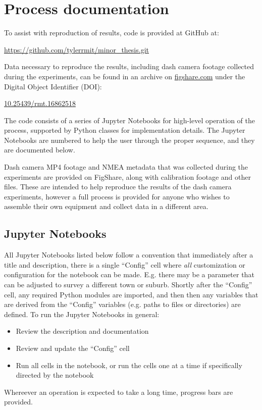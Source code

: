 \documentclass[11pt,twoside]{report}
\begin{document}

\appendix

\chapter{Process documentation}
\label{a:process}

To assist with reproduction of results, code is provided at GitHub at:

\url{https://github.com/tylerrmit/minor_thesis.git}

Data necessary to reproduce the results, including dash camera footage collected during the experiments, can be found in an archive on \url{figshare.com} under the Digital Object Identifier (DOI):

\url{10.25439/rmt.16862518}

The code consists of a series of Jupyter Notebooks for high-level operation of the process, supported by Python classes for implementation details.  The Jupyter Notebooks are numbered to help the user through the proper sequence, and they are documented below.

Dash camera MP4 footage and NMEA metadata that was collected during the experiments are provided on FigShare, along with calibration footage and other files.  These are intended to help reproduce the results of the dash camera experiments, however a full process is provided for anyone who wishes to assemble their own equipment and collect data in a different area.

\section{Jupyter Notebooks}
\label{aj}

All Jupyter Notebooks listed below follow a convention that immediately after a title and description, there is a single ``Config'' cell where \textit{all} customization or configuration for the notebook can be made.  E.g. there may be a parameter that can be adjusted to survey a different town or suburb.  Shortly after the ``Config'' cell, any required Python modules are imported, and then then any variables that are derived from the ``Config'' variables (e.g. paths to files or directories) are defined.  To run the Jupyter Notebooks in general:

\begin{itemize}
\item{Review the description and documentation}
\item{Review and update the ``Config'' cell}
\item{Run all cells in the notebook, or run the cells one at a time if specifically directed by the notebook}	
\end{itemize}
Whereever an operation is expected to take a long time, progress bars are provided.
\end{document}

